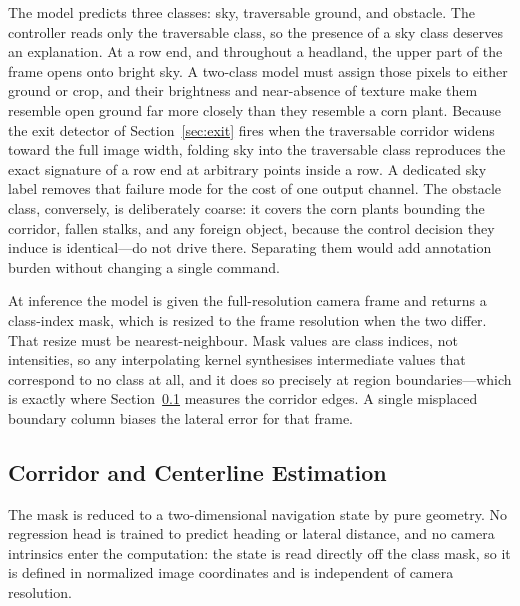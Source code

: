 \documentclass[conference]{IEEEtran}
\begin{document}
The model predicts three classes: sky, traversable ground, and obstacle. The
controller reads only the traversable class, so the presence of a sky class
deserves an explanation. At a row end, and throughout a headland, the upper part
of the frame opens onto bright sky. A two-class model must assign those pixels
to either ground or crop, and their brightness and near-absence of texture make
them resemble open ground far more closely than they resemble a corn plant.
Because the exit detector of Section~\ref{sec:exit} fires when the traversable
corridor widens toward the full image width, folding sky into the traversable
class reproduces the exact signature of a row end at arbitrary points inside a
row. A dedicated sky label removes that failure mode for the cost of one output
channel. The obstacle class, conversely, is deliberately coarse: it covers the
corn plants bounding the corridor, fallen stalks, and any foreign object,
because the control decision they induce is identical---do not drive there.
Separating them would add annotation burden without changing a single command.

At inference the model is given the full-resolution camera frame and returns a
class-index mask, which is resized to the frame resolution when the two differ.
That resize must be nearest-neighbour. Mask values are class indices, not
intensities, so any interpolating kernel synthesises intermediate values that
correspond to no class at all, and it does so precisely at region
boundaries---which is exactly where Section~\ref{sec:centerline} measures the
corridor edges. A single misplaced boundary column biases the lateral error for
that frame.

\subsection{Corridor and Centerline Estimation}
\label{sec:centerline}
The mask is reduced to a two-dimensional navigation state by pure geometry. No
regression head is trained to predict heading or lateral distance, and no camera
intrinsics enter the computation: the state is read directly off the class mask,
so it is defined in normalized image coordinates and is independent of camera
resolution.
\end{document}
